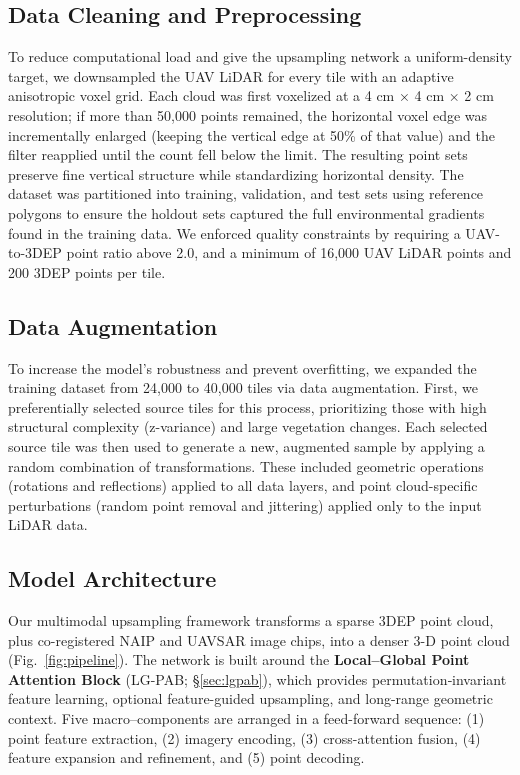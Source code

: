 \documentclass[remotesensing,article,submit,pdftex,moreauthors]{Definitions/mdpi}
\begin{document}
\subsection{Data Cleaning and Preprocessing}
To reduce computational load and give the upsampling network a uniform-density target, we downsampled the UAV LiDAR for every tile with an adaptive anisotropic voxel grid. Each cloud was first voxelized at a 4 cm × 4 cm × 2 cm resolution; if more than 50,000 points remained, the horizontal voxel edge was incrementally enlarged (keeping the vertical edge at 50\% of that value) and the filter reapplied until the count fell below the limit. The resulting point sets preserve fine vertical structure while standardizing horizontal density. The dataset was partitioned into training, validation, and test sets using reference polygons to ensure the holdout sets captured the full environmental gradients found in the training data. We enforced quality constraints by requiring a UAV-to-3DEP point ratio above 2.0, and a minimum of 16,000 UAV LiDAR points and 200 3DEP points per tile.

\subsection{Data Augmentation}
To increase the model's robustness and prevent overfitting, we expanded the training dataset from 24,000 to 40,000 tiles via data augmentation\cite{zhu2024advancements, shorten2019survey}. First, we preferentially selected source tiles for this process, prioritizing those with high structural complexity (z-variance) and large vegetation changes. Each selected source tile was then used to generate a new, augmented sample by applying a random combination of transformations. These included geometric operations (rotations and reflections) applied to all data layers, and point cloud-specific perturbations (random point removal and jittering) applied only to the input LiDAR data.


\subsection{Model Architecture}
\label{sec:architecture}
Our multimodal upsampling framework transforms a sparse 3DEP point cloud, plus co-registered NAIP and UAVSAR image chips, into a denser 3-D point cloud (Fig.~\ref{fig:pipeline}).
The network is built around the \textbf{Local–Global Point Attention Block} (LG-PAB; §\ref{sec:lgpab}), which provides permutation‐invariant feature learning, optional feature-guided upsampling, and long-range geometric context.
Five macro–components are arranged in a feed-forward sequence:
(1) point feature extraction, (2) imagery encoding, (3) cross-attention fusion, (4) feature expansion and refinement, and (5) point decoding.
\end{document}
